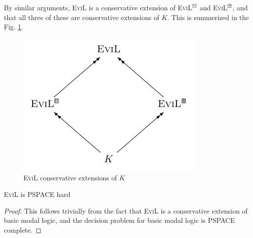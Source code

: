 By similar arguments, \textsc{EviL} is a conservative extension of \textsc{EviL}$^\boxminus$ and \textsc{EviL}$^\boxplus$, and that all three of these are conservative extensions of $K$.  This is summerized in the Fig. \ref{conservative-extensions}.

\begin{figure}[ht]
\begin{center}
\includegraphics[]{logics/evils.pdf}
\end{center}
\caption{\textsc{EviL} conservative extensions of $K$}
\label{conservative-extensions}
\end{figure}

\begin{lemma}
	\textsc{EviL} is \textsf{PSPACE} hard 
\end{lemma}
\begin{proof}
This follows trivially from the fact that \textsc{EviL} is a conservative extension of basic modal logic, and the decision problem for basic modal logic is \textsf{PSPACE} complete.
\end{proof}